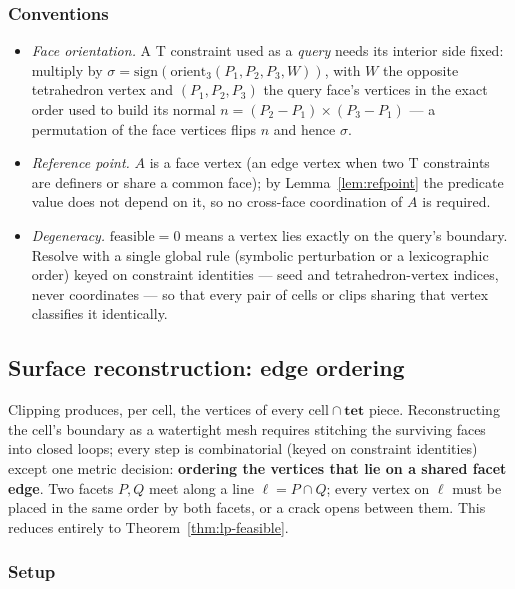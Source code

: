 \documentclass[12pt]{article}
\theoremstyle{definition}
\theoremstyle{remark}
\begin{document}
\subsubsection*{Conventions}
\begin{itemize}
    \item \emph{Face orientation.} A T constraint used as a \emph{query}
    needs its interior side fixed: multiply by
    $\sigma=\mathrm{sign}(\mathrm{orient}_3(P_1,P_2,P_3,W))$, with $W$ the
    opposite tetrahedron vertex and $(P_1,P_2,P_3)$ the query face's
    vertices in the exact order used to build its normal
    $n=(P_2-P_1)\times(P_3-P_1)$ --- a permutation of the face vertices
    flips $n$ and hence $\sigma$.
    \item \emph{Reference point.} $A$ is a face vertex (an edge vertex when
    two T constraints are definers or share a common face); by
    Lemma~\ref{lem:refpoint} the predicate value does not depend on it, so
    no cross-face coordination of $A$ is required.
    \item \emph{Degeneracy.} $\mathrm{feasible}=0$ means a vertex lies
    exactly on the query's boundary. Resolve with a single global rule
    (symbolic perturbation or a lexicographic order) keyed on constraint
    identities --- seed and tetrahedron-vertex indices, never coordinates
    --- so that every pair of cells or clips sharing that vertex classifies
    it identically.
\end{itemize}

\subsection{Surface reconstruction: edge ordering}\label{sec:lp-edge}

Clipping produces, per cell, the vertices of every $\mathrm{cell}\cap
\mathbf{tet}$ piece. Reconstructing the cell's boundary as a watertight mesh
requires stitching the surviving faces into closed loops; every step is
combinatorial (keyed on constraint identities) except one metric decision:
\textbf{ordering the vertices that lie on a shared facet edge}. Two facets
$P,Q$ meet along a line $\ell=P\cap Q$; every vertex on $\ell$ must be
placed in the same order by both facets, or a crack opens between them.
This reduces entirely to Theorem~\ref{thm:lp-feasible}.

\subsubsection*{Setup}
\end{document}

